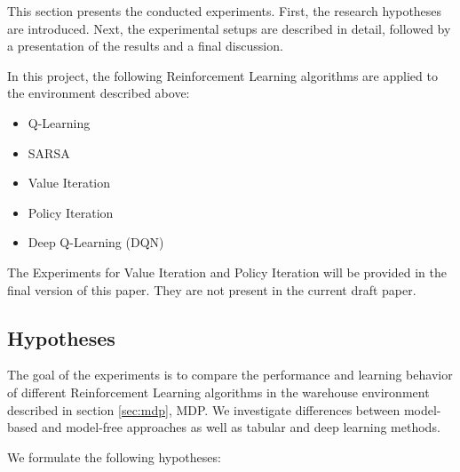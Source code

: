 \documentclass[a4paper,11pt]{article}
\theoremstyle{definition}
\begin{document}
This section presents the conducted experiments. 
First, the research hypotheses are introduced. 
Next, the experimental setups are described in detail, followed by a presentation of the results and a final discussion.

In this project, the following Reinforcement Learning algorithms are applied to the environment described above:

\begin{itemize}
    \item Q-Learning
    \item SARSA
    \item Value Iteration
    \item Policy Iteration
    \item Deep Q-Learning (DQN)
\end{itemize}

The Experiments for Value Iteration and Policy Iteration will be provided in the final version of this paper. They are not present in the current draft paper. 

\subsection{Hypotheses}

The goal of the experiments is to compare the performance and learning behavior of different Reinforcement Learning algorithms in the warehouse environment described in section \ref{sec:mdp}, MDP. 
We investigate differences between model-based and model-free approaches as well as tabular and deep learning methods.

We formulate the following hypotheses:
\end{document}
